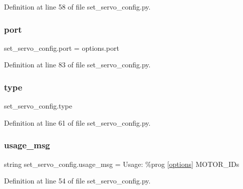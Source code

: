 Definition at line 58 of file set\+\_\+servo\+\_\+config.\+py.

\mbox{\label{namespaceset__servo__config_a324ec25da2c0124a9184e551f96f1419}} 
\subsubsection{\texorpdfstring{port}{port}}
{\footnotesize\ttfamily set\+\_\+servo\+\_\+config.\+port = options.\+port}



Definition at line 83 of file set\+\_\+servo\+\_\+config.\+py.

\mbox{\label{namespaceset__servo__config_abfe30d9b712ec84b87591b41835b0446}} 
\subsubsection{\texorpdfstring{type}{type}}
{\footnotesize\ttfamily set\+\_\+servo\+\_\+config.\+type}



Definition at line 61 of file set\+\_\+servo\+\_\+config.\+py.

\mbox{\label{namespaceset__servo__config_afb62a54e4938e903420f62984507fdd8}} 
\subsubsection{\texorpdfstring{usage\+\_\+msg}{usage\_msg}}
{\footnotesize\ttfamily string set\+\_\+servo\+\_\+config.\+usage\+\_\+msg = \textquotesingle{}Usage\+: \%prog \mbox{[}\hyperlink{namespaceset__servo__config_ac255726a992a254f0b0e6072b0f86233}{options}\mbox{]} M\+O\+T\+O\+R\+\_\+\+I\+Ds\textquotesingle{}}



Definition at line 54 of file set\+\_\+servo\+\_\+config.\+py.

